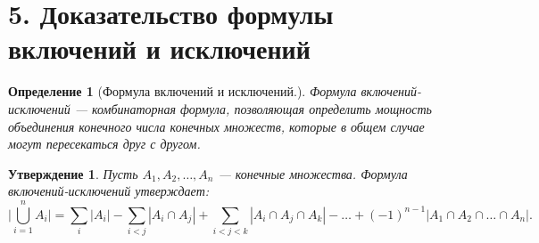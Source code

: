 \documentclass[a4paper,12pt]{article}
\newtheorem*{defin}{Определение}
\newtheorem*{state}{Утверждение}
\begin{document}
 	\section*{5. Доказательство формулы включений и исключений}
 	\begin{defin} [Формула включений и исключений.] Формула включений-исключений — комбинаторная формула, позволяющая определить мощность объединения конечного числа конечных множеств, которые в общем случае могут пересекаться друг с другом.
 	\end{defin}
 	\begin{state}
		Пусть $ A_{1}, A_{2},\ldots , A_{n} $ — конечные множества. Формула включений-исключений утверждает:
		$$\biggl | \bigcup_{i=1}^{n}A_i \biggl | =
		 \sum_{i} | A_i | - \sum_{i<j} | A_i \cap A_j | + \sum_{i<j<k} | A_i \cap A_j \cap A_k | - \ldots + (-1)^{n-1} | A_1 \cap A_2 \cap \ldots \cap A_n |.$$
 	\end{state}
\end{document}
